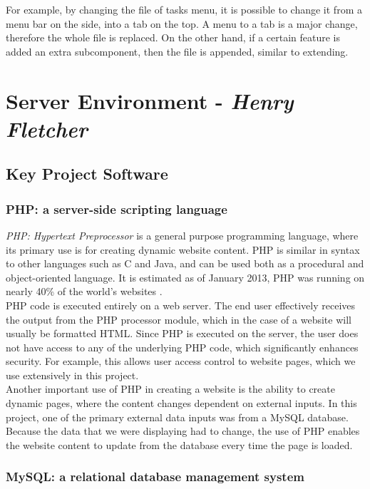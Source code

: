 \documentclass[11pt]{article}
\begin{document}
For example, by changing the file of tasks menu, it is possible to change it from a menu bar on the side, into a tab on the top.  A menu to a tab is a major change, therefore the whole file is replaced.  On the other hand, if a certain feature is added an extra subcomponent, then the file is appended, similar to extending.




\section{Server Environment - \textit{Henry Fletcher}}
\subsection{Key Project Software}

\subsubsection{PHP: a server-side scripting language}

\textit{PHP: Hypertext Preprocessor} is a general purpose programming language, where its primary use is for creating dynamic website content. PHP is similar in syntax to other languages such as C and Java, and can be used both as a procedural and object-oriented language. It is estimated as of January 2013, PHP was running on nearly 40\% of the world's websites \cite{netcraft:PHP}.
\\ \indent
PHP code is executed entirely on a web server. The end user effectively receives the output from the PHP processor module, which in the case of a website will usually be formatted HTML. Since PHP is executed on the server, the user does not have access to any of the underlying PHP code, which significantly enhances security. For example, this allows user access control to website pages, which we use extensively in this project.
\\ \indent
Another important use of PHP in creating a website is the ability to create dynamic pages, where the content changes dependent on external inputs. In this project, one of the primary external data inputs was from a MySQL database. Because the data that we were displaying had to change, the use of PHP enables the website content to update from the database every time the page is loaded.

\subsubsection{MySQL: a relational database management system} \label{mysql}
\end{document}

